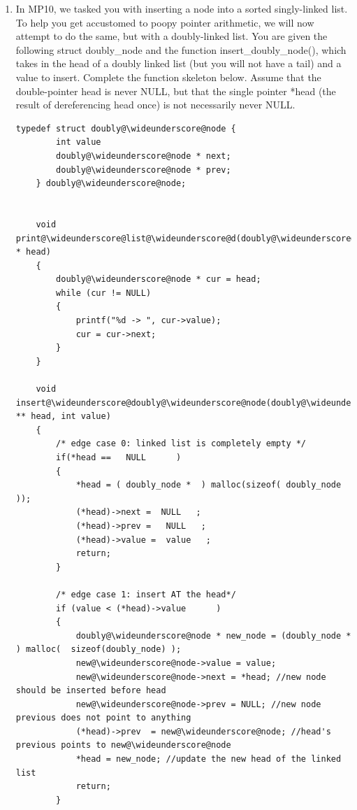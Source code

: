 \documentclass{article}
\begin{document}
\begin{enumerate}[label=(\alph*)]
\begin{lstlisting}[style=CStyle]
void find@\wideunderscore@best(Student* all, int num@\wideunderscore@students, Student** best) {
    for (int i = 0; i < num@\wideunderscore@students; i++) {
        if (all[i].GPA >        ) {
            // Fill:
        }
    }
}

\end{lstlisting}
\textcolor{blue} {
\&(all\_students[0])  \newline
\&best\_student   \newline
best\_student-$>$GPA  \newline
(*best)-$>$GPA  \newline
*best = \&(all[i]) \newline
}


\item In MP10, we tasked you with inserting a node into a sorted singly-linked list. To help you get accustomed to poopy pointer arithmetic, we will now attempt to do the same, but with a doubly-linked list. You are given the following struct doubly\_node and the function insert\_doubly\_node(), which takes in the head of a doubly linked list (but you will not have a tail) and a value to insert. Complete the function skeleton below. Assume that the double-pointer head is never NULL, but that the single pointer *head (the result of dereferencing head once) is not necessarily never NULL.

\begin{lstlisting}[style = CStyle]
    typedef struct doubly@\wideunderscore@node {
        int value
        doubly@\wideunderscore@node * next;
        doubly@\wideunderscore@node * prev;
    } doubly@\wideunderscore@node;


    void print@\wideunderscore@list@\wideunderscore@d(doubly@\wideunderscore@node * head)
    {
        doubly@\wideunderscore@node * cur = head;
        while (cur != NULL)
        {
            printf("%d -> ", cur->value);
            cur = cur->next;
        }
    }

    void insert@\wideunderscore@doubly@\wideunderscore@node(doubly@\wideunderscore@node ** head, int value) 
    {
        /* edge case 0: linked list is completely empty */
        if(*head ==   NULL      ) 
        {
            *head = ( doubly_node *  ) malloc(sizeof( doubly_node  ));
            (*head)->next =  NULL   ;
            (*head)->prev =   NULL   ;
            (*head)->value =  value   ;
            return;
        }

        /* edge case 1: insert AT the head*/
        if (value < (*head)->value      )
        {
            doubly@\wideunderscore@node * new_node = (doubly_node *   ) malloc(  sizeof(doubly_node) );
            new@\wideunderscore@node->value = value;
            new@\wideunderscore@node->next = *head; //new node should be inserted before head
            new@\wideunderscore@node->prev = NULL; //new node previous does not point to anything
            (*head)->prev  = new@\wideunderscore@node; //head's previous points to new@\wideunderscore@node
            *head = new_node; //update the new head of the linked list
            return;
        }


\end{lstlisting}
\end{enumerate}
\end{document}

